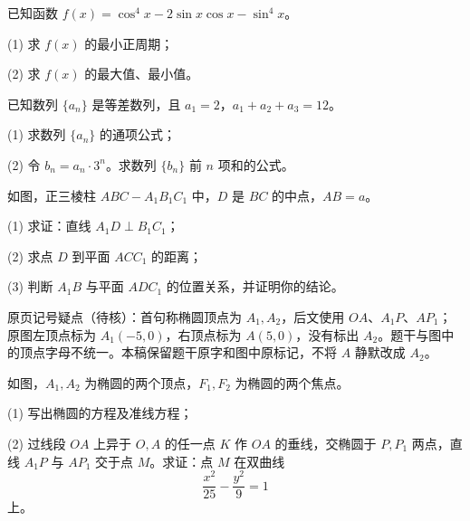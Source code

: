 \begin{question}
已知函数 \(f(x)=\cos^4x-2\sin x\cos x-\sin^4x\)。

(1) 求 \(f(x)\) 的最小正周期；

(2) 求 \(f(x)\) 的最大值、最小值。

\end{question}
\begin{question}
已知数列 \(\{a_n\}\) 是等差数列，且 \(a_1=2\)，\(a_1+a_2+a_3=12\)。

(1) 求数列 \(\{a_n\}\) 的通项公式；

(2) 令 \(b_n=a_n\cdot3^n\)。求数列 \(\{b_n\}\) 前 \(n\) 项和的公式。

\Needspace{0.4\textheight}
\end{question}
\begin{question}
如图，正三棱柱 \(ABC-A_1B_1C_1\) 中，\(D\) 是 \(BC\) 的中点，\(AB=a\)。

(1) 求证：直线 \(A_1D\perp B_1C_1\)；

(2) 求点 \(D\) 到平面 \(ACC_1\) 的距离；

(3) 判断 \(A_1B\) 与平面 \(ADC_1\) 的位置关系，并证明你的结论。
\nopagebreak[4]
\begin{center}\end{center}
\nopagebreak[4]
\Needspace{0.4\textheight}
\end{question}
\begin{question}
\begin{gktip}
原页记号疑点（待核）：首句称椭圆顶点为 \(A_1,A_2\)，后文使用 \(OA\)、\(A_1P\)、\(AP_1\)；原图左顶点标为 \(A_1(-5,0)\)，右顶点标为 \(A(5,0)\)，没有标出 \(A_2\)。题干与图中的顶点字母不统一。本稿保留题干原字和图中原标记，不将 \(A\) 静默改成 \(A_2\)。
\end{gktip}

如图，\(A_1,A_2\) 为椭圆的两个顶点，\(F_1,F_2\) 为椭圆的两个焦点。

(1) 写出椭圆的方程及准线方程；

(2) 过线段 \(OA\) 上异于 \(O,A\) 的任一点 \(K\) 作 \(OA\) 的垂线，交椭圆于 \(P,P_1\) 两点，直线 \(A_1P\) 与 \(AP_1\) 交于点 \(M\)。求证：点 \(M\) 在双曲线
\nopagebreak[4]
\[
\frac{x^2}{25}-\frac{y^2}{9}=1
\]
上。
\nopagebreak[4]
\begin{center}\end{center}
\nopagebreak[4]
\Needspace{0.4\textheight}
\end{question}
